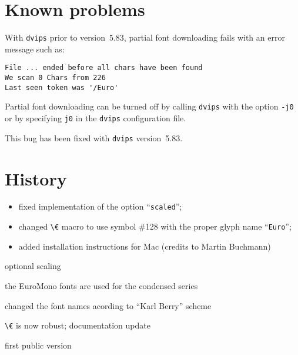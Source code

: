 \documentclass[DIV=9, pagesize=auto]{scrartcl}
\makeatletter
\newcommand*{\pkg}[1]{\textsf{#1}}
\newcommand*{\cs}[1]{\texttt{\textbackslash#1}}
\newcommand*{\cmd}[1]{\cs{\expandafter\@gobble\string#1}}
\newcommand*{\opt}[1]{\texttt{#1}}
\makeatother
\begin{document}
\section{Known problems}

With \texttt{dvips} prior to version~5.83, partial font downloading
fails with an error message such as:
%
\begin{verbatim}
File ... ended before all chars have been found
We scan 0 Chars from 226
Last seen token was '/Euro'
\end{verbatim}
%
Partial font downloading can be turned off by calling \texttt{dvips}
with the option \texttt{-j0} or by specifying \texttt{j0} in the \texttt{dvips}
configuration file.

This bug has been fixed with \texttt{dvips} version~5.83.


\section{History}


\begin{itemize}
\item fixed implementation of the option ``\opt{scaled}'';
\item changed \cmd{\euro} macro to use symbol \#128 with the 
  proper glyph name ``\texttt{Euro}'';
\item added installation instructions for Mac
  (credits to Martin Buchmann)
\end{itemize}
    

optional scaling 
  

the \pkg{EuroMono} fonts are used for the condensed series
  

changed the font names acording to ``Karl Berry'' scheme
  

\cmd{\euro} is now robust; 
documentation update
  

first public version
\end{document}
